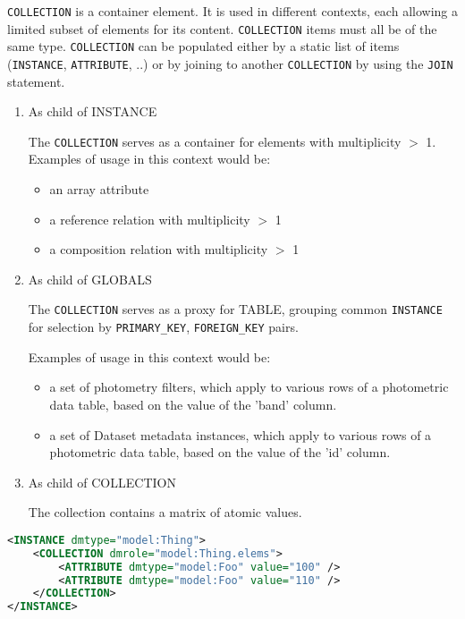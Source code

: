     \texttt{COLLECTION} is a container element.  It is used in different contexts, each allowing a limited subset of elements for its content. 
     \texttt{COLLECTION} items must all be of the same type.
    \texttt{COLLECTION} can be populated either by a static list of items (\texttt{INSTANCE}, \texttt{ATTRIBUTE}, ..) or by joining to another \texttt{COLLECTION} by using the \texttt{JOIN} statement.    
    
    \begin{enumerate}
    \item{As child of INSTANCE}
      
      The \texttt{COLLECTION} serves as a container for elements with multiplicity $>$ 1.\\
      Examples of usage in this context would be:
      \begin{itemize}
        \item an array attribute
        \item a reference relation with multiplicity $>$ 1
        \item a composition relation with multiplicity $>$ 1
      \end{itemize}
      
    \item{As child of GLOBALS}
          
      The \texttt{COLLECTION} serves as a proxy for TABLE, grouping common \texttt{INSTANCE}  for selection by \texttt{PRIMARY\_KEY}, \texttt{FOREIGN\_KEY} pairs.
      
      Examples of usage in this context would be:
      \begin{itemize}
        \item a set of photometry filters, which apply to various rows of a photometric data table, based on the value of the 'band' column.
        \item a set of Dataset metadata instances, which apply to various rows of a photometric data table, based on the value of the 'id' column.
      \end{itemize}
          
    \item{As child of COLLECTION}
    
	The collection contains a matrix of  atomic values.
        
    \end{enumerate}
   
\begin{lstlisting}[caption={Example of a \texttt{COLLECTION} child of \texttt{INSTANCE}. It must have a role as an enclosing \texttt{INSTANCE} component.},language=XML]
<INSTANCE dmtype="model:Thing">
    <COLLECTION dmrole="model:Thing.elems">
        <ATTRIBUTE dmtype="model:Foo" value="100" />
        <ATTRIBUTE dmtype="model:Foo" value="110" />
    </COLLECTION>
</INSTANCE>
\end{lstlisting}   


